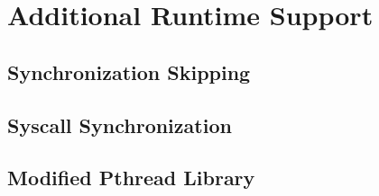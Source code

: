 \chapter{Additional Runtime Support}
\section{Synchronization Skipping}
\section{Syscall Synchronization}
\section{Modified Pthread Library}